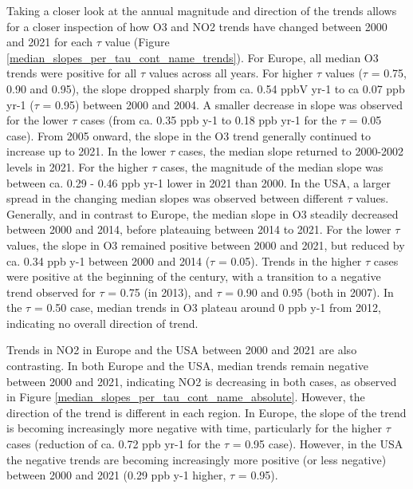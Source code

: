 \documentclass[journal abbreviation, manuscript]{copernicus}
\begin{document}
Taking a closer look at the annual magnitude and direction of the trends allows for a closer inspection of how O3 and NO2 trends have changed between 2000 and 2021 for each $\tau$ value (Figure \ref{median_slopes_per_tau_cont_name_trends}). For Europe, all median O3 trends were positive for all $\tau$ values across all years. For higher $\tau$ values ($\tau$ = 0.75, 0.90 and 0.95), the slope dropped sharply from ca. 0.54 ppbV yr-1 to ca 0.07 ppb yr-1 ($\tau$ = 0.95) between 2000 and 2004. A smaller decrease in slope was observed for the lower $\tau$ cases (from ca. 0.35 ppb y-1 to 0.18 ppb yr-1 for the $\tau$ = 0.05 case). From 2005 onward, the slope in the O3 trend generally continued to increase up to 2021. In the lower $\tau$ cases, the median slope returned to 2000-2002 levels in 2021. For the higher $\tau$ cases, the magnitude of the median slope was between ca. 0.29 - 0.46 ppb yr-1 lower in 2021 than 2000. In the USA, a larger spread in the changing median slopes was observed between different $\tau$ values. Generally, and in contrast to Europe, the median slope in O3 steadily decreased between 2000 and 2014, before plateauing between 2014 to 2021. For the lower $\tau$ values, the slope in O3 remained positive between 2000 and 2021, but reduced by ca. 0.34 ppb y-1 between 2000 and 2014 ($\tau$ = 0.05). Trends in the higher $\tau$ cases were positive at the beginning of the century, with a transition to a negative trend observed for $\tau$ = 0.75 (in 2013), and $\tau$ = 0.90 and 0.95 (both in 2007). In the $\tau$ = 0.50 case, median trends in O3 plateau around 0 ppb y-1 from 2012, indicating no overall direction of trend.

Trends in NO2 in Europe and the USA between 2000 and 2021 are also contrasting. In both Europe and the USA, median trends remain negative between 2000 and 2021, indicating NO2 is decreasing in both cases, as observed in Figure \ref{median_slopes_per_tau_cont_name_absolute}. However, the direction of the trend is different in each region. In Europe, the slope of the trend is becoming increasingly more negative with time, particularly for the higher $\tau$ cases (reduction of ca. 0.72 ppb yr-1 for the $\tau$ = 0.95 case). However, in the USA the negative trends are becoming increasingly more positive (or less negative) between 2000 and 2021 (0.29 ppb y-1 higher, $\tau$ = 0.95). 

\end{document}
